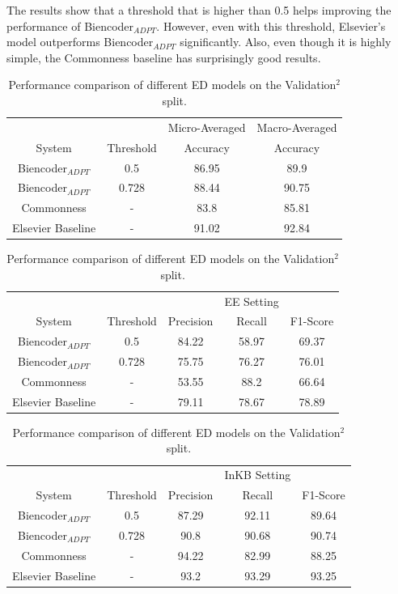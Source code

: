 \documentclass{report}
\theoremstyle{definition}
\theoremstyle{remark}
\begin{document}
The results show that a threshold that is higher than 0.5 helps improving the performance of Biencoder$_{ADPT}$. However, even with this threshold, Elsevier's model outperforms Biencoder$_{ADPT}$ significantly. Also, even though it is highly simple, the Commonness baseline has surprisingly good results.

\begin{table}
    \centering
    \begin{tabular}{cccc}
    &&Micro-Averaged & Macro-Averaged\\
    System    & Threshold & Accuracy &Accuracy \\
    \hline
    Biencoder$_{ADPT}$  & 0.5 & 86.95&89.9\\
    Biencoder$_{ADPT}$  & 0.728 & 88.44&90.75\\
    Commonness  & -  &83.8&85.81 \\
    Elsevier Baseline & - & 91.02&92.84\\
    \end{tabular}
    
    \vspace{0.5cm}\begin{tabular}{ccccc}
    &&&EE Setting & \\
    System    & Threshold & Precision & Recall & F1-Score \\
    \hline
    Biencoder$_{ADPT}$  & 0.5 & 84.22& 58.97&	69.37\\
    Biencoder$_{ADPT}$  & 0.728 & 75.75& 76.27&	76.01\\
    Commonness  & -  &53.55& 88.2&	66.64 \\
    Elsevier Baseline & - &79.11& 78.67&	78.89 \\
    \end{tabular}
    
    \vspace{0.5cm}\begin{tabular}{ccccc}
    &&&InKB Setting & \\
    System    & Threshold & Precision & Recall & F1-Score \\
    \hline
    Biencoder$_{ADPT}$  & 0.5 & 87.29&92.11&89.64\\
    Biencoder$_{ADPT}$  & 0.728 & 90.8&90.68&	90.74\\
    Commonness  & - &94.22&82.99	&88.25 \\
    Elsevier Baseline & - & 93.2&93.29&	93.25\\
    \end{tabular}
    
    \caption{Performance comparison of different ED models on the Validation$^2$ split.}
    \label{tab:edresultsval}
\end{table}
\end{document}
